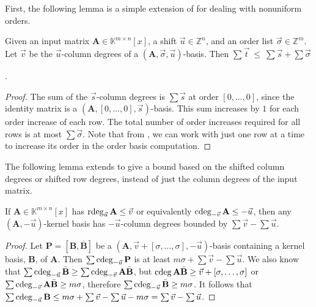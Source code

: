 First, the following lemma is a simple extension of 
for dealing with nonuniform orders.
\begin{lem}
\label{lem:boundOfSumOfShiftedDegreesOfOrderBasisWithNonuniformOrder}Given
an input matrix $\mathbf{A}\in\mathbb{K}^{m\times n}[x]$, a shift
$\vec{u}\in\mathbb{Z}^{n}$, and an order list $\vec{\sigma}\in\mathbb{Z}^{m}$.
Let $\vec{v}$ be the $\vec{u}$-column degrees of a $\left(\mathbf{A},\vec{\sigma},\vec{u}\right)$-basis.
Then $\sum\vec{t}~\le~\sum\vec{s}+\sum\vec{\sigma}$%
\begin{comment}
 and $\max_{i}\left(\vec{t}_{i}-\vec{s}_{i}\right)\le\sigma$
\end{comment}
\textup{}%
\begin{comment}
need to permute the columns to put the pivots on the diagonal.
\end{comment}
. \end{lem}
\begin{proof}
\begin{comment}
For example, for a input matrix with two rows, instead of increasing
the order of both rows to $\left[1,1\right]$ at once, we can work
on the second row first to increase the order to $\left[0,1\right]$,
and then compute to order $\left[1,1\right]$.  
\end{comment}
The sum of the $\vec{s}$-column degrees is $\sum\vec{s}$ at order
$\left[0,\dots,0\right]$, since the identity matrix is a $\left(\mathbf{A},\left[0,\dots,0\right],\vec{s}\right)$-basis.
This sum increases by $1$ for each order increase of each row. The
total number of order increases required for all rows is at most $\sum\vec{\sigma}$.
Note that from , we can work with
just one row at a time to increase its order in the order basis computation. 
\end{proof}
The following lemma extends 
to give a bound based on the shifted column degrees or shifted row
degrees, instead of just the column degrees of the input matrix.
\begin{lem}
\label{lem:generalNullspaceBasisDegreeBound}If $\mathbf{A}\in\mathbb{K}^{m\times n}[x]$
has $\rdeg_{\vec{u}}\mathbf{A}\le\vec{v}$ or equivalently $\cdeg_{-\vec{v}}\mathbf{A}\le-\vec{u}$,
then any $(\mathbf{A},-\vec{u})$-kernel basis has $-\vec{u}$-column
degrees bounded by $\sum\vec{v}-\sum\vec{u}$. \end{lem}
\begin{proof}
Let $\mathbf{P}=\left[\mathbf{B},\bar{\mathbf{B}}\right]$ be a $\left(\mathbf{A},\vec{v}+\left[\sigma,\dots,\sigma\right],-\vec{u}\right)$-basis
containing a kernel basis, $\mathbf{B}$, of $\mathbf{A}$. Then $\sum\cdeg_{-\vec{u}}\mathbf{P}$
is at least $m\sigma+\sum\vec{v}-\sum\vec{u}$. We also know that
$\sum\cdeg_{-\vec{u}}\bar{\mathbf{B}}\ge\sum\cdeg_{-\vec{v}}\mathbf{A}\bar{\mathbf{B}}$,
but $\cdeg\mathbf{A}\bar{\mathbf{B}}\ge\vec{v}+\left[\sigma,\dots,\sigma\right]$
or $\sum\cdeg_{-\vec{v}}\mathbf{A}\bar{\mathbf{B}}\ge m\sigma$, therefore
$\sum\cdeg_{-\vec{u}}\bar{\mathbf{B}}\ge m\sigma$. It follows that
$\sum\cdeg_{-\vec{u}}\mathbf{B}\le m\sigma+\sum\vec{v}-\sum\vec{u}-m\sigma=\sum\vec{v}-\sum\vec{u}$.
\end{proof}
